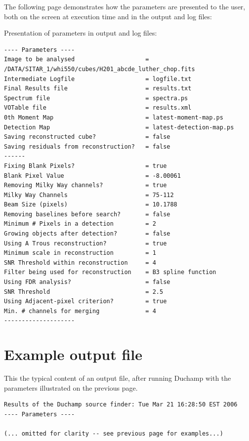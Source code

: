 \documentclass[12pt,a4paper]{article}
\begin{document}
The following page demonstrates how the parameters are presented to
the user, both on the screen at execution time and in the output and
log files:
\newpage
\begin{landscape}
Presentation of parameters in output and log files:  
\begin{verbatim}
---- Parameters ----
Image to be analysed                    = /DATA/SITAR_1/whi550/cubes/H201_abcde_luther_chop.fits
Intermediate Logfile                    = logfile.txt
Final Results file                      = results.txt
Spectrum file                           = spectra.ps
VOTable file                            = results.xml
0th Moment Map                          = latest-moment-map.ps
Detection Map                           = latest-detection-map.ps
Saving reconstructed cube?              = false
Saving residuals from reconstruction?   = false
------
Fixing Blank Pixels?                    = true
Blank Pixel Value                       = -8.00061
Removing Milky Way channels?            = true
Milky Way Channels                      = 75-112
Beam Size (pixels)                      = 10.1788
Removing baselines before search?       = false
Minimum # Pixels in a detection         = 2
Growing objects after detection?        = false
Using A Trous reconstruction?           = true
Minimum scale in reconstruction         = 1
SNR Threshold within reconstruction     = 4
Filter being used for reconstruction    = B3 spline function
Using FDR analysis?                     = false
SNR Threshold                           = 2.5
Using Adjacent-pixel criterion?         = true
Min. # channels for merging             = 4
--------------------
\end{verbatim}

\newpage
\section{Example output file}
\label{app-output}
This the typical content of an output file, after running Duchamp
with the parameters illustrated on the previous page.

{\scriptsize 
  \begin{verbatim}
Results of the Duchamp source finder: Tue Mar 21 16:28:50 EST 2006
---- Parameters ----

(... omitted for clarity -- see previous page for examples...)


\end{verbatim}}
\end{landscape}
\end{document}
